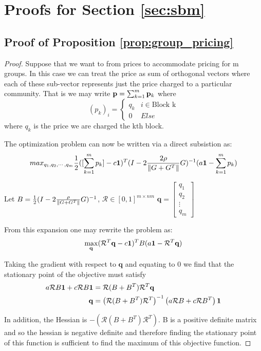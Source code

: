 \section{Proofs for Section \ref{sec:sbm}}

\subsection{Proof of Proposition \ref{prop:group_pricing}}
\begin{proof} 
    
    Suppose that we want to from prices to accommodate pricing for m groups. 
    In this case we can treat the price as sum of orthogonal vectors where each of these sub-vector represents just the price charged to a particular community. That is we may write $\mathbf{p} = \sum_{k=1}^m \mathbf{p}_k $ where $$(p_k)_i = \begin{cases} q_k  & i\in \text{Block k} \\ 0 & Else \end{cases}$$ where $q_k$ is the price we are charged the kth block. 


    The optimization problem can now be written via a direct subsistion as:
    \begin{equation}
        max_{q_1, q_2, \cdots, q_m}  \frac{1}{2}  ( [\sum_{k = 1}^{m}   p_k ] - c \mathbf{1} )^T (I - 2\frac{2\rho}{\|G + G^T\|}G )^{-1} ( a\mathbf{1} - \sum_{k = 1}^{m} p_k )
    \end{equation}

     Let $B = \frac{1}{2} (I - 2\frac{\rho}{\|G+G^T\|} G)^{-1} $, $\mathcal{R} \in [0,1]^{m \times nm}$ $\mathbf{q} = \begin{bmatrix}  q_1  \\  q_2  \\ \vdots \\ q_m \end{bmatrix}$

     From this expansion one may rewrite the problem as: 
     $$ \max_\mathbf{q}  ( \mathcal{R}^T \mathbf{q} - c \mathbf{1} )^T B (a\mathbf{1} - \mathcal{R}^T \mathbf{q} ) $$

    Taking the gradient with respect to $\mathbf{q}$ and equating to 0 we find that the stationary point of the objective must satisfy
    \begin{align*}
        a  \mathcal{R} B \mathbf{1} + c \mathcal{R} B \mathbf{1} &= \mathcal{R} (B+B^T) \mathcal{R}^T \mathbf{q} \\ 
        \mathbf{q} &= \left( \mathcal{R} (B+B^T) \mathcal{R}^T \right)^{-1} \left( a \mathcal{R} B + c\mathcal{R} B^T \right) \mathbf{1} 
    \end{align*}

     In addition, the Hessian is $-\left( \mathcal{R} (B+B^T) \mathcal{R}^T \right)$. B is a positive definite matrix and so the hessian is negative definite and therefore finding the stationary point of this function is sufficient to find the maximum of this objective function.
\end{proof}
